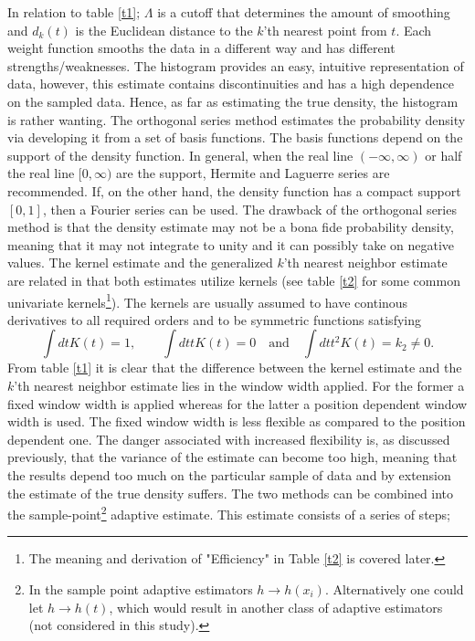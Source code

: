 In relation to table \ref{t1}; $\Lambda$ is a cutoff that determines the amount of smoothing and $d_k(t)$ is the Euclidean distance to the $k$'th nearest point from $t$. Each weight function smooths the data in a different way and has different strengths/weaknesses. The histogram provides an easy, intuitive representation of data, however, this estimate contains discontinuities and has a high dependence on the sampled data. Hence, as far as estimating the true density, the histogram is rather wanting. The orthogonal series method estimates the probability density via developing it from a set of basis functions. The basis functions depend on the support of the density function. In general, when the real line $(-\infty,\infty)$ or half the real line $[0,\infty)$ are the support, Hermite and Laguerre series are recommended\citep{Efromovich}. If, on the other hand, the density function has a compact support $[0,1]$, then a Fourier series can be used\citep{silverman}. The drawback of the orthogonal series method is that the density estimate may not be a bona fide probability density, meaning that it may not integrate to unity and it can possibly take on negative values\citep{Efromovich}. The kernel estimate and the generalized $k$'th nearest neighbor estimate are related in that both estimates utilize kernels (see table \ref{t2} for some common\citep{silverman} univariate kernels\footnote{The meaning and derivation of "Efficiency" in Table \ref{t2} is covered later.}). The kernels are usually assumed to have continous derivatives to all required orders and to be symmetric functions satisfying\citep{silverman}
\begin{equation}
	\int dt K(t)=1,\qquad \int dt tK(t)=0\quad \text{and}\quad \int dt t^2K(t)=k_2\neq 0.
	\label{prop}
\end{equation}
From table \ref{t1} it is clear that the difference between the kernel estimate and the $k$'th nearest neighbor estimate lies in the window width applied. For the former a fixed window width is applied whereas for the latter a position dependent window width is used. The fixed window width is less flexible as compared to the position dependent one. The danger associated with increased flexibility is, as discussed previously, that the variance of the estimate can become too high, meaning that the results depend too much on the particular sample of data and by extension the estimate of the true density suffers. The two methods can be combined into the sample-point\footnote{In the sample point adaptive estimators $h\rightarrow h(x_i)$. Alternatively one could let $h\rightarrow h(t)$, which would result in another class of adaptive estimators (not considered in this study).} adaptive estimate. This estimate consists of a series of steps\citep{silverman};
